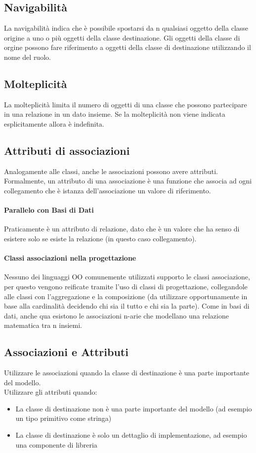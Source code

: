 \subsection*{Navigabilità}
La navigabilità indica che è possibile spostarsi da n qualsiasi oggetto della classe
origine a uno o più oggetti della classe destinazione. Gli oggetti della classe
di orgine possono fare riferimento a oggetti della classe di destinazione utilizzando
il nome del ruolo.
\subsection*{Molteplicità} La molteplicità limita il numero di oggetti di una classe
che possono partecipare in una relazione in un dato insieme. Se la molteplicità non viene
indicata esplicitamente allora è indefinita.
\subsection*{Attributi di associazioni} Analogamente alle classi, anche le associazioni
possono avere attributi. Formalmente, un attributo di una associazione è una funzione
che associa ad ogni collegamento che è istanza dell'associazione un valore di riferimento.
\paragraph*{Parallelo con Basi di Dati} Praticamente è un attributo di relazione, dato che
è un valore che ha senso di esistere solo se esiste la relazione (in questo caso collegamento).
\paragraph*{Classi associazioni nella progettazione} Nessuno dei linguaggi OO comunemente
utilizzati supporto le classi associazione, per questo vengono reificate tramite l'uso di
classi di progettazione, collegandole alle classi con l'aggregazione e la composizione
(da utilizzare opportunamente in base alla cardinalità decidendo chi sia il tutto e chi sia la parte).
Come in basi di dati, anche qua esistono le associazioni n-arie che modellano una
relazione matematica tra n insiemi.
\subsection*{Associazioni e Attributi}
Utilizzare le associazioni quando la classe di destinazione è una parte importante del modello.
\\ Utilizzare gli attributi quando:
\begin{itemize}
    \item La classe di destinazione non è una parte importante del modello (ad esempio un tipo primitivo come stringa)
    \item La classe di destinazione è solo un dettaglio di implementazione, ad esempio
    una componente di libreria
\end{itemize}
